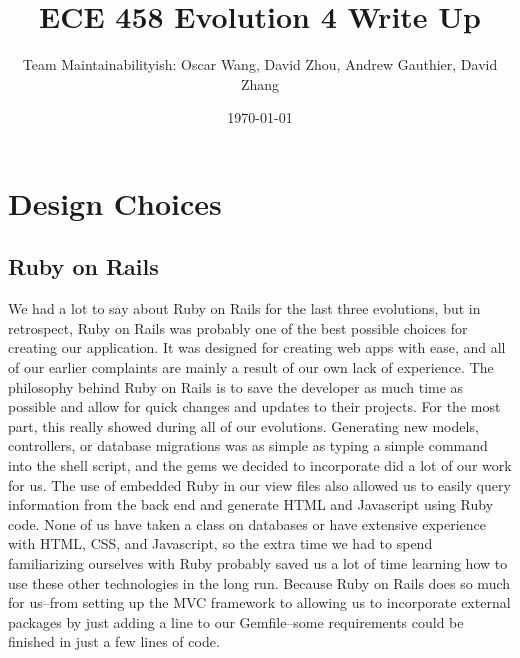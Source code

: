 \documentclass{article}
\author{Team Maintainabilityish: Oscar Wang, David Zhou, Andrew Gauthier, David Zhang}
\date{\today}
\title{ECE 458 Evolution 4 Write Up}
\begin{document}
\maketitle
\section{Design Choices}
\subsection{Ruby on Rails}
We had a lot to say about Ruby on Rails for the last three evolutions, but in retrospect, Ruby on Rails was probably one of the best possible choices for creating our application.  It was designed for creating web apps with ease, and all of our earlier complaints are mainly a result of our own lack of experience.  The philosophy behind Ruby on Rails is to save the developer as much time as possible and allow for quick changes and updates to their projects.  For the most part, this really showed during all of our evolutions.  Generating new models, controllers, or database migrations was as simple as typing a simple command into the shell script, and the gems we decided to incorporate did a lot of our work for us.  The use of embedded Ruby in our view files also allowed us to easily query information from the back end and generate HTML and Javascript using Ruby code.  None of us have taken a class on databases or have extensive experience with HTML, CSS, and Javascript, so the extra time we had to spend familiarizing ourselves with Ruby probably saved us a lot of time learning how to use these other technologies in the long run.  Because Ruby on Rails does so much for us--from setting up the MVC framework to allowing us to incorporate external packages by just adding a line to our Gemfile--some requirements could be finished in just a few lines of code.\par
\end{document}
